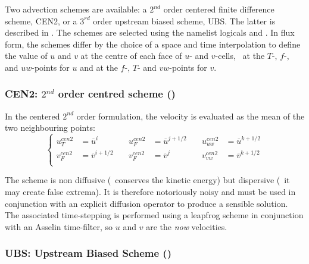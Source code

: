 \documentclass[../main/NEMO_manual]{subfiles}
\begin{document}
Two advection schemes are available:
a $2^{nd}$ order centered finite difference scheme, CEN2,
or a $3^{rd}$ order upstream biased scheme, UBS.
The latter is described in \citet{shchepetkin.mcwilliams_OM05}.
The schemes are selected using the namelist logicals  and .
In flux form, the schemes differ by the choice of a space and time interpolation to define the value of
$u$ and $v$ at the centre of each face of $u$- and $v$-cells, \ie\ at the $T$-, $f$-,
and $uw$-points for $u$ and at the $f$-, $T$- and $vw$-points for $v$.

\subsubsection[CEN2: $2^{nd}$ order centred scheme (\forcode{ln_dynadv_cen2})]{CEN2: $2^{nd}$ order centred scheme (\protect{})}
\label{subsec:DYN_adv_cen2}

In the centered $2^{nd}$ order formulation, the velocity is evaluated as the mean of the two neighbouring points:
\begin{equation}
  \label{eq:DYN_adv_cen2}
  \left\{
    \begin{aligned}
      u_T^{cen2} &=\overline u^{i }       \quad &  u_F^{cen2} &=\overline u^{j+1/2}  \quad &  u_{uw}^{cen2} &=\overline u^{k+1/2}   \\
      v_F^{cen2} &=\overline v ^{i+1/2} \quad & v_F^{cen2} &=\overline v^j		\quad &  v_{vw}^{cen2} &=\overline v ^{k+1/2}  \\
    \end{aligned}
  \right.
\end{equation}

The scheme is non diffusive (\ie\ conserves the kinetic energy) but dispersive (\ie\ it may create false extrema).
It is therefore notoriously noisy and must be used in conjunction with an explicit diffusion operator to
produce a sensible solution.
The associated time-stepping is performed using a leapfrog scheme in conjunction with an Asselin time-filter,
so $u$ and $v$ are the \emph{now} velocities.

\subsubsection[UBS: Upstream Biased Scheme (\forcode{ln_dynadv_ubs})]{UBS: Upstream Biased Scheme (\protect{})}
\label{subsec:DYN_adv_ubs}
\end{document}
